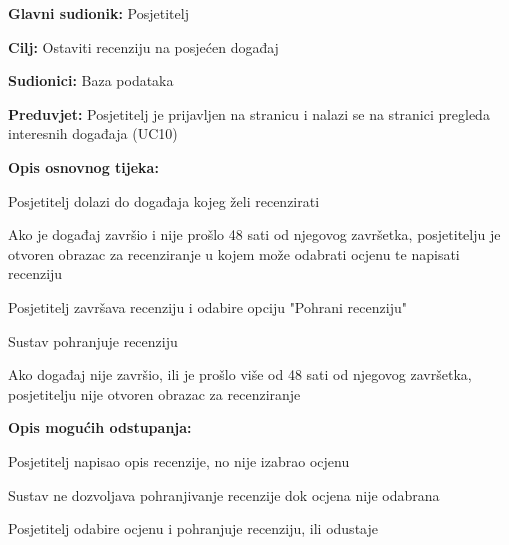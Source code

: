 					\noindent {}
\begin{packed_item}
	\item \textbf{Glavni sudionik:} Posjetitelj
	\item  \textbf{Cilj:} Ostaviti recenziju na posjećen događaj
	\item  \textbf{Sudionici:} Baza podataka
	\item  \textbf{Preduvjet:} Posjetitelj je prijavljen na stranicu i nalazi se na stranici pregleda interesnih događaja (UC10)
	\item  \textbf{Opis osnovnog tijeka:}
	
	\item[] \begin{packed_enum}
		
		\item Posjetitelj dolazi do događaja kojeg želi recenzirati
		\item Ako je događaj završio i nije prošlo 48 sati od njegovog završetka, posjetitelju je otvoren obrazac za recenziranje u kojem može odabrati ocjenu te napisati recenziju
		\item Posjetitelj završava recenziju i odabire opciju "Pohrani recenziju"
		\item Sustav pohranjuje recenziju
		\item Ako događaj nije završio, ili je prošlo više od 48 sati od njegovog završetka, posjetitelju nije otvoren obrazac za recenziranje

	\end{packed_enum}
	
			\item  \textbf{Opis mogućih odstupanja:}
			
	\item[] \begin{packed_item}
		\item[2.a] Posjetitelj napisao opis recenzije, no nije izabrao ocjenu
			\item[] \begin{packed_enum}
		\item Sustav ne dozvoljava pohranjivanje recenzije dok ocjena nije odabrana
		\item Posjetitelj odabire ocjenu i pohranjuje recenziju, ili odustaje
		
	\end{packed_enum}
\end{packed_item}
\end{packed_item}

